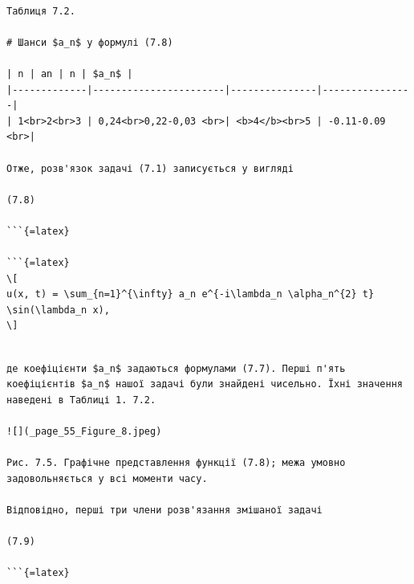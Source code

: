 \documentclass[
  ukrainian,
]{article}
\begin{document}
\begin{verbatim}

Таблиця 7.2.

# Шанси $a_n$ у формулі (7.8)

| n | an | n | $a_n$ |
|-------------|-----------------------|---------------|----------------|
| 1<br>2<br>3 | 0,24<br>0,22-0,03 <br>| <b>4</b><br>5 | -0.11-0.09 <br>|

Отже, розв'язок задачі (7.1) записується у вигляді

(7.8)

```{=latex}

```{=latex}
\[
u(x, t) = \sum_{n=1}^{\infty} a_n e^{-i\lambda_n \alpha_n^{2} t} \sin(\lambda_n x),
\]
\end{verbatim}

\begin{verbatim}

де коефіцієнти $a_n$ задаються формулами (7.7). Перші п'ять коефіцієнтів $a_n$ нашої задачі були знайдені чисельно. Їхні значення наведені в Таблиці 1. 7.2.

![](_page_55_Figure_8.jpeg)

Рис. 7.5. Графічне представлення функції (7.8); межа умовно задовольняється у всі моменти часу.

Відповідно, перші три члени розв'язання змішаної задачі

(7.9)

```{=latex}


\end{verbatim}
\end{document}
